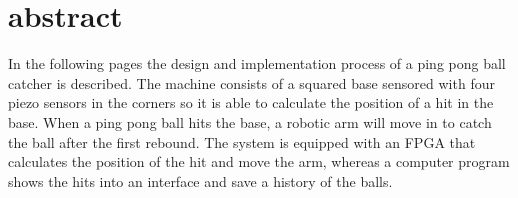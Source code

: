 \chapter*{abstract}
In the following pages the design and implementation process of a ping pong ball catcher is described. The machine consists of a squared base sensored with four piezo sensors in the corners so it is able to calculate the position of a hit in the base. 
When a ping pong ball hits the base, a robotic arm will move in to catch the ball after the first rebound.
The system is equipped with an FPGA that calculates the position of the hit and move the arm, whereas a computer program shows the hits into an interface and save a history of the balls.